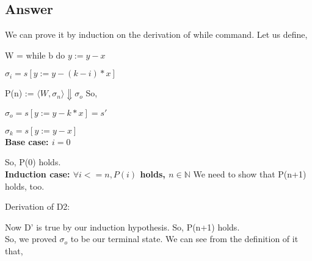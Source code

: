 \documentclass[a4paper, 11pt]{article}
\begin{document}
\subsection{Answer}

We can prove it by induction on the derivation of while command.\newline 
Let us define, 

W = $ \textrm{while b do } y := y-x $

$\sigma_i = s[y := y -(k-i)*x]$

P(n) := $ \langle W, \sigma_n \rangle \Downarrow \sigma_o$ \newline
So,

$\sigma_o = s[y := y -k*x] = s'$

$\sigma_k = s[y := y -x]$ 
\\[5mm]
\textbf{Base case: $i = 0 $}
\begin{prooftree}

  
\end{prooftree} 
So, P(0) holds.
\\[5mm]
\textbf{Induction case: $\forall i <= n, P(i)$ holds, $n \in \mathbb{N}$}
We need to show that P(n+1) holds, too.

\begin{prooftree}
  
  
\end{prooftree}
Derivation of D2:
\begin{prooftree}
  
  
\end{prooftree}
Now D' is true by our induction hypothesis. So, P(n+1) holds. 
\\[5mm]
So, we proved $\sigma_o$ to be our terminal state. We can see from the definition of it that,
\end{document}
